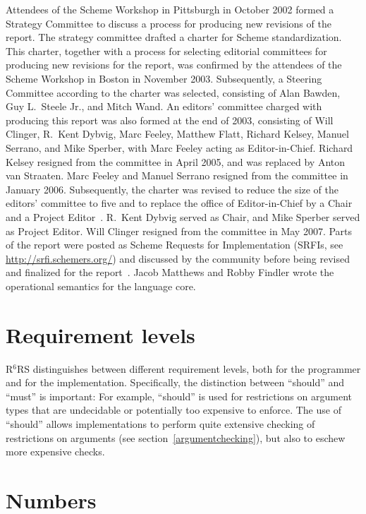 \documentclass[twoside,twocolumn]{algol60}
\newcommand{\rn}[1]{R$^{#1}$RS}
\begin{document}
Attendees of the Scheme Workshop in Pittsburgh in October 2002 formed
a Strategy Committee to discuss a process for producing new revisions
of the report.  The strategy committee drafted a charter for Scheme
standardization.  This charter, together with a process for selecting
editorial committees for producing new revisions for the report, was
confirmed by the attendees of the Scheme Workshop in Boston in
November 2003.  Subsequently, a Steering Committee according to the
charter was selected, consisting of Alan Bawden, Guy L.\ Steele Jr.,
and Mitch Wand.  An editors' committee charged with producing this report was
also formed at the end of 2003, consisting of Will Clinger,
R.\ Kent Dybvig, Marc Feeley, Matthew Flatt, Richard Kelsey, Manuel
Serrano, and Mike Sperber, with Marc Feeley acting as Editor-in-Chief.
Richard Kelsey resigned from the committee in April 2005, and was
replaced by Anton van Straaten.  
Marc Feeley and Manuel Serrano
resigned from the committee in January 2006.  Subsequently, the charter
was revised to reduce the size of the editors' committee to five and
to replace the office of Editor-in-Chief by a Chair and a Project
Editor~\cite{SchemeCharter2006}.  R.\ Kent Dybvig served as Chair, and
Mike Sperber served as Project Editor.  Will Clinger resigned from the
committee in May 2007.
Parts of the report were posted as Scheme Requests for Implementation
(SRFIs, see \url{http://srfi.schemers.org/})
and discussed by the community before being revised and finalized for
the report~\cite{srfi75,srfi76,srfi77,srfi83,srfi93}.
Jacob Matthews and Robby
Findler wrote the operational semantics for the language core.


\chapter{Requirement levels}

\rn{6} distinguishes between different requirement levels, both for
the programmer and for the implementation.  Specifically, the
distinction between ``should'' and ``must'' is important: For example,
``should'' is used for restrictions on argument types that are
undecidable or potentially too expensive to enforce.  The use of
``should'' allows implementations to perform quite extensive checking
of restrictions on arguments (see section~\ref{argumentchecking}), but
also to eschew more expensive checks.


\chapter{Numbers}
\label{numberschapter}
\end{document}
